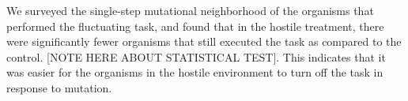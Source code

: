 We surveyed the single-step mutational neighborhood of the organisms that performed the fluctuating task, and found that in the hostile treatment, there were significantly fewer organisms that still executed the task as compared to the control. [NOTE HERE ABOUT STATISTICAL TEST]. This indicates that it was easier for the organisms in the hostile environment to turn off the task in response to mutation. 